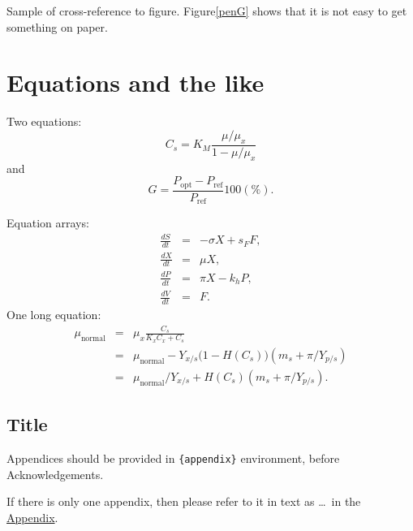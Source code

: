 \documentclass[aoas]{imsart}
\numberwithin{equation}{section}
\theoremstyle{plain}
\theoremstyle{remark}
\begin{document}
Sample of cross-reference to figure. Figure\ref{penG} shows that it is
not easy to get something on paper.

\hypertarget{equations-and-the-like}{%
\section{Equations and the like}\label{equations-and-the-like}}

Two equations: \begin{equation}
    C_{s}  =  K_{M} \frac{\mu/\mu_{x}}{1-\mu/\mu_{x}} \label{ccs}
\end{equation} and \begin{equation}
    G = \frac{P_{\mathrm{opt}} - P_{\mathrm{ref}}}{P_{\mathrm{ref}}}  100(\%).
\end{equation}

Equation arrays: \begin{eqnarray}
  \frac{dS}{dt} & = & - \sigma X + s_{F} F,\\
  \frac{dX}{dt} & = &   \mu    X,\\
  \frac{dP}{dt} & = &   \pi    X - k_{h} P,\\
  \frac{dV}{dt} & = &   F.
\end{eqnarray} One long equation: \begin{eqnarray}
 \mu_{\text{normal}} & = & \mu_{x} \frac{C_{s}}{K_{x}C_{x}+C_{s}}  \nonumber\\
                     & = & \mu_{\text{normal}} - Y_{x/s}\bigl(1-H(C_{s})\bigr)(m_{s}+\pi /Y_{p/s})\\
                     & = & \mu_{\text{normal}}/Y_{x/s}+ H(C_{s}) (m_{s}+ \pi /Y_{p/s}).\nonumber
\end{eqnarray}

\begin{appendix}

\hypertarget{appn}{%
\section*{Title}\label{appn}}

Appendices should be provided in \verb|{appendix}| environment, before
Acknowledgements.

If there is only one appendix, then please refer to it in text as
\ldots~in the \hyperref[appn]{Appendix}.

\end{appendix}
\end{document}
